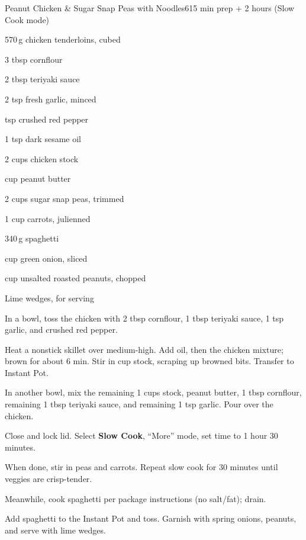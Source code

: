 \begin{recipebox}{Peanut Chicken \& Sugar Snap Peas with Noodles}{6}{15 min prep + 2 hours (Slow Cook mode)}
  \begin{ingredients}
    \item 570\,g chicken tenderloins, cubed
    \item 3 tbsp cornflour
    \item 2 tbsp teriyaki sauce
    \item 2 tsp fresh garlic, minced
    \item {} tsp crushed red pepper
    \item 1 tsp dark sesame oil
    \item 2 cups chicken stock
    \item {} cup peanut butter
    \item 2 cups sugar snap peas, trimmed
    \item 1 cup carrots, julienned
    \item 340\,g spaghetti
    \item {} cup green onion, sliced
    \item {} cup unsalted roasted peanuts, chopped
    \item Lime wedges, for serving
  \end{ingredients}

  \begin{method}
    \item In a bowl, toss the chicken with 2 tbsp cornflour, 1 tbsp teriyaki sauce, 1 tsp garlic, and crushed red pepper.
    \item Heat a nonstick skillet over medium-high. Add oil, then the chicken mixture; brown for about 6 min. Stir in  cup stock, scraping up browned bits. Transfer to Instant Pot.
    \item In another bowl, mix the remaining 1 cups stock, peanut butter, 1 tbsp cornflour, remaining 1 tbsp teriyaki sauce, and remaining 1 tsp garlic. Pour over the chicken.
    \item Close and lock lid. Select \textbf{Slow Cook}, “More” mode, set time to 1 hour 30 minutes.
    \item When done, stir in peas and carrots. Repeat slow cook for 30 minutes until veggies are crisp-tender.
    \item Meanwhile, cook spaghetti per package instructions (no salt/fat); drain.
    \item Add spaghetti to the Instant Pot and toss. Garnish with spring onions, peanuts, and serve with lime wedges.
  \end{method}
\end{recipebox}
